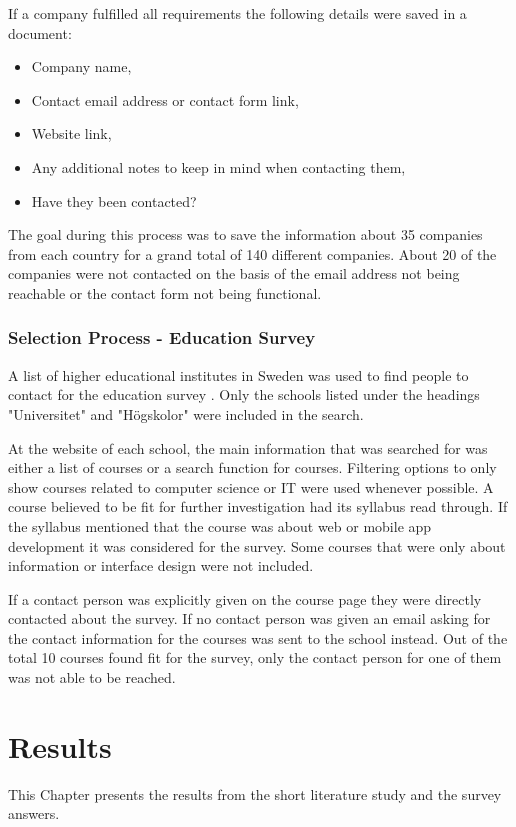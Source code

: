\documentclass[a4paper,12pt]{article}
\begin{document}
If a company fulfilled all requirements the following details were saved in a document:

\begin{itemize}
    \item Company name,
    \item Contact email address or contact form link,
    \item Website link,
    \item Any additional notes to keep in mind when contacting them,
    \item Have they been contacted?
\end{itemize}

The goal during this process was to save the information about 35 companies from each country for a grand total of 140 different companies. About 20 of the companies were not contacted on the basis of the email address not being reachable or the contact form not being functional.

\subsubsection{Selection Process - Education Survey}
\label{Project_participantSelection_processEdu}
A list of higher educational institutes in Sweden was used to find people to contact for the education survey \cite{higher_edu_sweden}. Only the schools listed under the headings "Universitet" and "Högskolor" were included in the search.

At the website of each school, the main information that was searched for was either a list of courses or a search function for courses. Filtering options to only show courses related to computer science or IT were used whenever possible. A course believed to be fit for further investigation had its syllabus read through. If the syllabus mentioned that the course was about web or mobile app development it was considered for the survey. Some courses that were only about information or interface design were not included.

If a contact person was explicitly given on the course page they were directly contacted about the survey. If no contact person was given an email asking for the contact information for the courses was sent to the school instead. Out of the total 10 courses found fit for the survey, only the contact person for one of them was not able to be reached.


\newpage
\section{Results}
\label{Results}
This Chapter presents the results from the short literature study and the survey answers.
\end{document}
